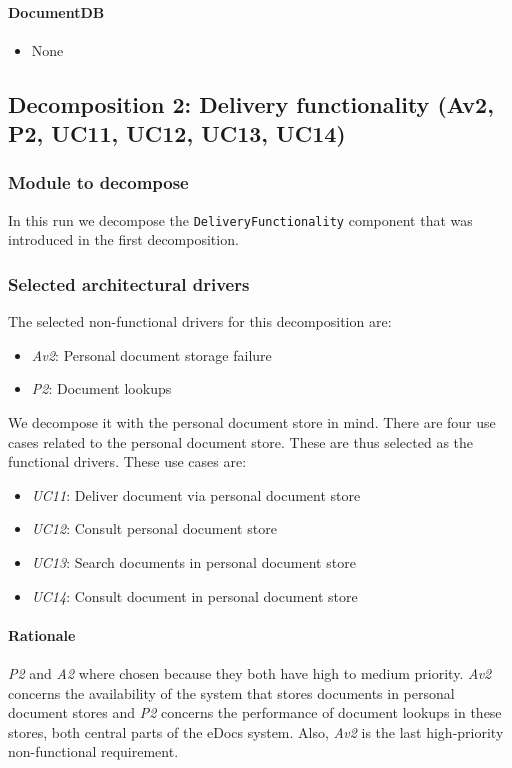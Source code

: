 \documentclass[a4paper,10pt]{article}
\begin{document}
\paragraph{DocumentDB}
\begin{itemize}
	\item None
\end{itemize}



\subsection{Decomposition 2: Delivery functionality (Av2, P2, UC11, UC12, UC13, UC14)}
\subsubsection{Module to decompose}
In this run we decompose the \texttt{DeliveryFunctionality} component that was introduced in the first decomposition. 

\subsubsection{Selected architectural drivers}
The selected non-functional drivers for this decomposition are:

\begin{itemize}
	\item \emph{Av2}: Personal document storage failure
	\item \emph{P2}: Document lookups
\end{itemize}

We decompose it with the personal document store in mind. There are four use cases related to the personal document store. These are thus selected as the functional drivers. These use cases are: 

\begin{itemize}
	\item \emph{UC11}: Deliver document via personal document store
	\item \emph{UC12}: Consult personal document store
	\item \emph{UC13}: Search documents in personal document store
	\item \emph{UC14}: Consult document in personal document store
\end{itemize}

\paragraph{Rationale} \emph{P2} and \emph{A2} where chosen because they both have high to medium priority. \emph{Av2} concerns the availability of the system that stores documents in personal document stores and \emph{P2} concerns the performance of document lookups in these stores, both central parts of the eDocs system. Also, \emph{Av2} is the last high-priority non-functional requirement.
\end{document}
